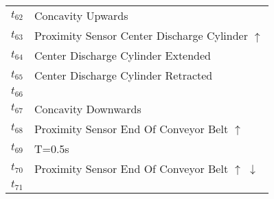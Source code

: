 \begin{table}[H]
\begin{tabular}{M{5cm}M{10cm}}
\hyperlink{partialNet:t621}{\hypertarget{partialTable:t62}{$t_{62}$}} & Concavity Upwards\\
\hyperlink{partialNet:t631}{\hypertarget{partialTable:t63}{$t_{63}$}} & Proximity Sensor Center Discharge Cylinder \(\uparrow\)\\
\hyperlink{partialNet:t641}{\hypertarget{partialTable:t64}{$t_{64}$}} & Center Discharge Cylinder Extended\\
\hyperlink{partialNet:t651}{\hypertarget{partialTable:t65}{$t_{65}$}} & Center Discharge Cylinder Retracted\\
\hyperlink{partialNet:t661}{\hypertarget{partialTable:t66}{$t_{66}$}} & \\
\hyperlink{partialNet:t671}{\hypertarget{partialTable:t67}{$t_{67}$}} & Concavity Downwards\\
\hyperlink{partialNet:t681}{\hypertarget{partialTable:t68}{$t_{68}$}} & Proximity Sensor End Of Conveyor Belt \(\uparrow\)\\
\hyperlink{partialNet:tt691}{\hypertarget{partialTable:tt69}{$t_{69}$}} & T=0.5s\\
\hyperlink{partialNet:t701}{\hypertarget{partialTable:t70}{$t_{70}$}} & Proximity Sensor End Of Conveyor Belt \(\uparrow\)       \(\downarrow\)\\
\hyperlink{partialNet:t711}{\hypertarget{partialTable:t71}{$t_{71}$}} & \\
\end{tabular}
\end{table}
